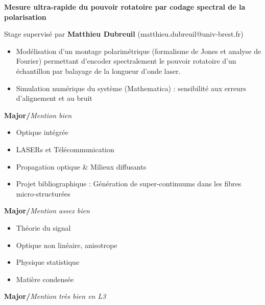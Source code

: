 \documentclass[9pt,a4paper,academicons]{altacv}
\begin{document}

\textbf{Mesure ultra-rapide du pouvoir rotatoire par codage spectral de la
	polarisation}\smallskip
	
	Stage supervisé par \textbf{Matthieu Dubreuil} (matthieu.dubreuil@univ-brest.fr)
	\smallskip
\small{
	\begin{itemize}
		\item Modélisation d'un montage polarimétrique (formalisme de Jones et analyse de Fourier) permettant d'encoder spectralement le pouvoir rotatoire d'un échantillon par balayage de la longueur d'onde laser.
		\item Simulation numérique du système (Mathematica) : sensibilité aux erreurs d'alignement et au bruit
	\end{itemize}
}





\hfill \textbf{Major/}\textit{Mention bien}
\vspace{-1em}\small{
	
  \begin{itemize}
    \item Optique intégrée
    \item LASERs et Télécommunication
    \item Propagation optique \& Milieux diffusants
    \item Projet bibliographique : Génération de super-continuums dans les fibres micro-structurées
  \end{itemize}
}

\divider

\hfill\textbf{Major/}\textit{Mention assez bien} 
\vspace{-1em}\small{
  \begin{itemize}
    \item Théorie du signal
    \item Optique non linéaire, anisotrope
    \item Physique statistique
    \item Matière condensée
  \end{itemize}
}
\divider

\hfill \textbf{Major/}\textit{Mention très bien en L3}
\end{document}
